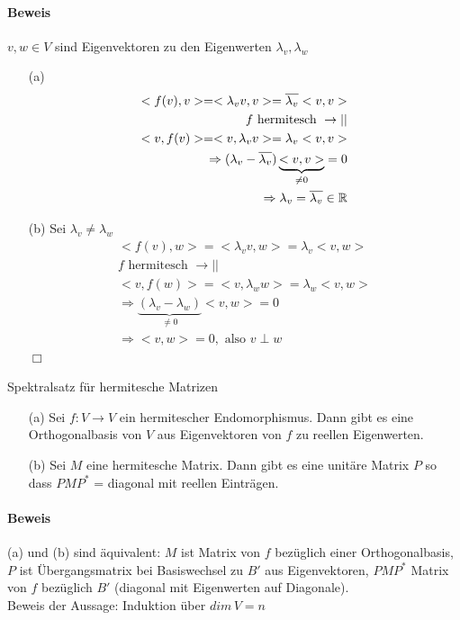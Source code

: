 \paragraph{Beweis}
$v, w \in V$ sind Eigenvektoren zu den Eigenwerten $\lambda_v, \lambda_w$
\begin{itemize}
\item[(a)] 
\begin{align}
<f(v), v> = <\lambda_v v, v> = \overline{\lambda_v} <v, v> \\
f \text{ hermitesch } \rightarrow || \\
<v, f(v)> = <v, \lambda_v v> = \lambda_v <v, v> \\
\Rightarrow (\lambda_v - \overline{\lambda_v}) \underbrace{<v, v>}_{\neq 0} = 0 \\
\Rightarrow \lambda_v = \overline{\lambda_v} \in \mathbb{R}
\end{align}

\item[(b)] Sei $\lambda_v \neq \lambda_w$
\begin{align}
<f(v), w> = <\lambda_v v, w> = \lambda_v <v, w> \\
f \text{ hermitesch } \rightarrow || \\
<v, f(w)> = <v, \lambda_w w> = \lambda_w <v, w> \\
\Rightarrow \underbrace{(\lambda_v - \lambda_w)}_{\neq 0} <v, w> = 0 \\
\Rightarrow <v, w> = 0, \text{ also } v \perp w
\end{align}
\hspace*{1cm} \hfill $\Box$
\end{itemize}

\begin{satz}{Spektralsatz für hermitesche Matrizen} %
\label{satz553}
\begin{itemize}
\item[(a)] Sei $f: V \rightarrow V$ ein hermitescher Endomorphismus. Dann gibt es eine Orthogonalbasis von $V$ aus Eigenvektoren von $f$ zu reellen Eigenwerten.
\item[(b)] Sei $M$ eine hermitesche Matrix. Dann gibt es eine unitäre Matrix $P$ so dass $PMP^{*}$ = diagonal mit reellen Einträgen.
\end{itemize}
\end{satz}

\paragraph{Beweis}
(a) und (b) sind äquivalent: $M$ ist Matrix von $f$ bezüglich einer Orthogonalbasis, $P$ ist Übergangsmatrix bei Basiswechsel zu $B'$ aus Eigenvektoren, $PMP^{*}$ Matrix von $f$ bezüglich $B'$ (diagonal mit Eigenwerten auf Diagonale). \\
Beweis der Aussage: Induktion über $dim\, V = n$

